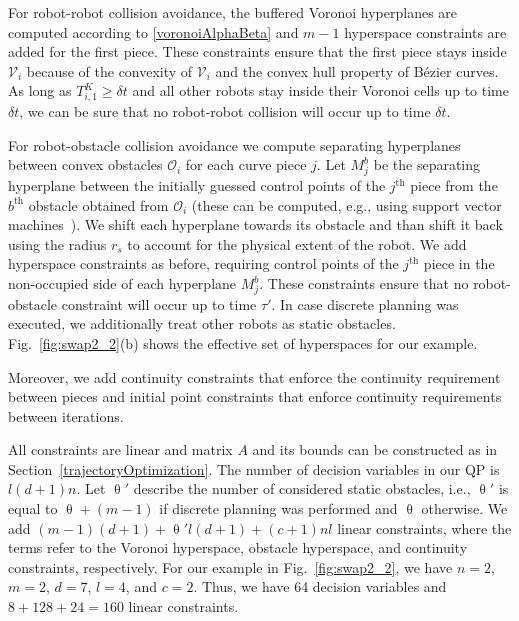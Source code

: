 \documentclass{svproc}
\newcommand{\vP}{\mathbf{P}}
\newcommand{\cV}{\mathcal{V}}
\newcommand{\cO}{\mathcal{O}}
\renewcommand{\th}{^{\text{th}}}
\begin{document}
For robot-robot collision avoidance, the buffered Voronoi hyperplanes are computed according to \eqref{voronoiAlphaBeta} and $m-1$ hyperspace constraints are added for the first piece.
These constraints ensure that the first piece stays inside $\cV_i$ because of the convexity of $\cV_i$ and the convex hull property of B\'ezier curves.
As long as $T^{K}_{i,1} \geq \delta t$ and all other robots stay inside their Voronoi cells up to time $\delta t$, we can be sure that no robot-robot collision will occur up to time $\delta t$.

For robot-obstacle collision avoidance we compute separating hyperplanes between convex obstacles $\cO_i$ for each curve piece $j$.
Let $M_j^b$ be the separating hyperplane between the initially guessed control points of the $j\th$ piece from the $b\th$ obstacle obtained from $\cO_i$ (these can be computed, e.g., using support vector machines~\cite{SVM}).
We shift each hyperplane towards its obstacle and than shift it back using the radius $r_s$ to account for the physical extent of the robot.
We add hyperspace constraints as before, requiring control points of the $j\th$ piece in the non-occupied side of each hyperplane $M_j^b$.
These constraints ensure that no robot-obstacle constraint will occur up to time $\tau'$.
In case discrete planning was executed, we additionally treat other robots as static obstacles.
Fig.~\ref{fig:swap2_2}(b) shows the effective set of hyperspaces for our example.

Moreover, we add continuity constraints that enforce the continuity requirement between pieces and initial point constraints that enforce continuity requirements between iterations.

All constraints are linear and matrix $A$ and its bounds can be constructed as in Section~\ref{trajectoryOptimization}.
The number of decision variables in our QP is $l(d+1)n$.
Let $\uptheta'$ describe the number of considered static obstacles, i.e., $\uptheta'$ is equal to $\uptheta + (m-1)$ if discrete planning was performed and $\uptheta$ otherwise.
We add $(m-1)(d+1) + \uptheta' l(d+1) + (c+1)nl$ linear constraints, where the terms refer to the Voronoi hyperspace, obstacle hyperspace, and continuity constraints, respectively.
For our example in Fig.~\ref{fig:swap2_2}, we have $n=2$, $m=2$, $d=7$, $l=4$, and $c=2$. Thus, we have 64 decision variables and $8 + 128 + 24 = 160$ linear constraints.
\end{document}
